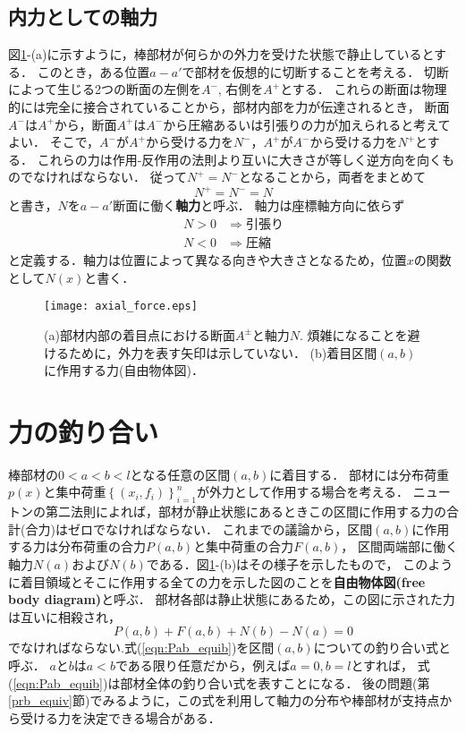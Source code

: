 \documentclass[10pt,a4j]{jbook}
\begin{document}
\subsection{内力としての軸力}
図\ref{fig:defN}-(a)に示すように，棒部材が何らかの外力を受けた状態で静止しているとする．
このとき，ある位置$a-a'$で部材を仮想的に切断することを考える．
切断によって生じる2つの断面の左側を$A^-$, 右側を$A^+$とする．
これらの断面は物理的には完全に接合されていることから，部材内部を力が伝達されるとき，
断面$A^-$は$A^+$から，断面$A^+$は$A^-$から圧縮あるいは引張りの力が加えられると考えてよい．
そこで，$A^−$が$A^+$から受ける力を$N^-$，$A^+$が$A^-$から受ける力を$N^+$とする．
これらの力は作用-反作用の法則より互いに大きさが等しく逆方向を向くものでなければならない．
従って$N^+=N^-$となることから，両者をまとめて
\begin{equation}
	N^+=N^-=N
	\label{Npm}
\end{equation}
と書き，$N$を$a-a'$断面に働く{\rm \bf 軸力}と呼ぶ．
軸力は座標軸方向に依らず
\[
\begin{array}{cl}
	N>0 & \Rightarrow 引張り　\\
	N<0 & \Rightarrow 圧縮
\end{array}
\]
と定義する．軸力は位置によって異なる向きや大きさとなるため，位置$x$の関数として$N(x)$と書く．
\begin{figure}[h]
	\begin{center}
	\texttt{[image: axial\_force.eps]} 
	\end{center}
	\caption{(a)部材内部の着目点における断面$A^{\pm}$と軸力$N$.
	煩雑になることを避けるために，外力を表す矢印は示していない．
	(b)着目区間$(a,b)$に作用する力(自由物体図)．} 
	\label{fig:defN}
\end{figure}
\section{力の釣り合い}
棒部材の$0<a<b<l$となる任意の区間$(a,b)$に着目する．
部材には分布荷重$p(x)$と集中荷重$\left\{(x_i, f_i)\right\}_{i=1}^n$が外力として作用する場合を考える．
ニュートンの第二法則によれば，部材が静止状態にあるときこの区間に作用する力の合計(合力)はゼロでなければならない．
これまでの議論から，区間$(a,b)$に作用する力は分布荷重の合力$P(a,b)$と集中荷重の合力$F(a,b)$，
区間両端部に働く軸力$N(a)$および$N(b)$である．図\ref{fig:defN}-(b)はその様子を示したもので，
このように着目領域とそこに作用する全ての力を示した図のことを{\rm \bf 自由物体図(free body diagram)}と呼ぶ．
部材各部は静止状態にあるため，この図に示された力は互いに相殺され，
\begin{equation}
	P(a,b)+F(a,b)+N(b)-N(a)=0
	\label{eqn:Pab_equib}
\end{equation}
でなければならない.式(\ref{eqn:Pab_equib})を区間$(a,b)$についての釣り合い式と呼ぶ．
$a$と$b$は$a<b$である限り任意だから，例えば$a=0, b=l$とすれば，
式(\ref{eqn:Pab_equib})は部材全体の釣り合い式を表すことになる．
後の問題(第\ref{prb_equiv}節)でみるように，この式を利用して軸力の分布や棒部材が支持点から受ける力を決定できる場合がある．
\\
\end{document}
